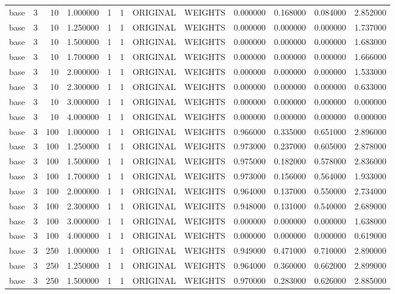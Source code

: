 \begin{tabular}{lrrrllllrrrr}
base & 3 & 10 & 1.000000 & 1 & 1 & ORIGINAL & WEIGHTS & 0.000000 & 0.168000 & 0.084000 & 2.852000 \\
base & 3 & 10 & 1.250000 & 1 & 1 & ORIGINAL & WEIGHTS & 0.000000 & 0.000000 & 0.000000 & 1.737000 \\
base & 3 & 10 & 1.500000 & 1 & 1 & ORIGINAL & WEIGHTS & 0.000000 & 0.000000 & 0.000000 & 1.683000 \\
base & 3 & 10 & 1.700000 & 1 & 1 & ORIGINAL & WEIGHTS & 0.000000 & 0.000000 & 0.000000 & 1.666000 \\
base & 3 & 10 & 2.000000 & 1 & 1 & ORIGINAL & WEIGHTS & 0.000000 & 0.000000 & 0.000000 & 1.533000 \\
base & 3 & 10 & 2.300000 & 1 & 1 & ORIGINAL & WEIGHTS & 0.000000 & 0.000000 & 0.000000 & 0.633000 \\
base & 3 & 10 & 3.000000 & 1 & 1 & ORIGINAL & WEIGHTS & 0.000000 & 0.000000 & 0.000000 & 0.000000 \\
base & 3 & 10 & 4.000000 & 1 & 1 & ORIGINAL & WEIGHTS & 0.000000 & 0.000000 & 0.000000 & 0.000000 \\
base & 3 & 100 & 1.000000 & 1 & 1 & ORIGINAL & WEIGHTS & 0.966000 & 0.335000 & 0.651000 & 2.896000 \\
base & 3 & 100 & 1.250000 & 1 & 1 & ORIGINAL & WEIGHTS & 0.973000 & 0.237000 & 0.605000 & 2.878000 \\
base & 3 & 100 & 1.500000 & 1 & 1 & ORIGINAL & WEIGHTS & 0.975000 & 0.182000 & 0.578000 & 2.836000 \\
base & 3 & 100 & 1.700000 & 1 & 1 & ORIGINAL & WEIGHTS & 0.973000 & 0.156000 & 0.564000 & 1.933000 \\
base & 3 & 100 & 2.000000 & 1 & 1 & ORIGINAL & WEIGHTS & 0.964000 & 0.137000 & 0.550000 & 2.734000 \\
base & 3 & 100 & 2.300000 & 1 & 1 & ORIGINAL & WEIGHTS & 0.948000 & 0.131000 & 0.540000 & 2.689000 \\
base & 3 & 100 & 3.000000 & 1 & 1 & ORIGINAL & WEIGHTS & 0.000000 & 0.000000 & 0.000000 & 1.638000 \\
base & 3 & 100 & 4.000000 & 1 & 1 & ORIGINAL & WEIGHTS & 0.000000 & 0.000000 & 0.000000 & 0.619000 \\
base & 3 & 250 & 1.000000 & 1 & 1 & ORIGINAL & WEIGHTS & 0.949000 & 0.471000 & 0.710000 & 2.890000 \\
base & 3 & 250 & 1.250000 & 1 & 1 & ORIGINAL & WEIGHTS & 0.964000 & 0.360000 & 0.662000 & 2.899000 \\
base & 3 & 250 & 1.500000 & 1 & 1 & ORIGINAL & WEIGHTS & 0.970000 & 0.283000 & 0.626000 & 2.885000 \\

\end{tabular}
